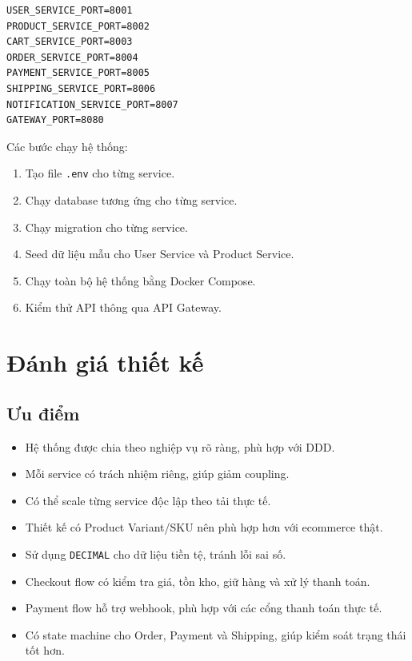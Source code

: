 \begin{lstlisting}[style=code]
USER_SERVICE_PORT=8001
PRODUCT_SERVICE_PORT=8002
CART_SERVICE_PORT=8003
ORDER_SERVICE_PORT=8004
PAYMENT_SERVICE_PORT=8005
SHIPPING_SERVICE_PORT=8006
NOTIFICATION_SERVICE_PORT=8007
GATEWAY_PORT=8080
\end{lstlisting}

Các bước chạy hệ thống:

\begin{enumerate}
  \item Tạo file \texttt{.env} cho từng service.
  \item Chạy database tương ứng cho từng service.
  \item Chạy migration cho từng service.
  \item Seed dữ liệu mẫu cho User Service và Product Service.
  \item Chạy toàn bộ hệ thống bằng Docker Compose.
  \item Kiểm thử API thông qua API Gateway.
\end{enumerate}

\section{Đánh giá thiết kế}

\subsection{Ưu điểm}

\begin{itemize}
  \item Hệ thống được chia theo nghiệp vụ rõ ràng, phù hợp với DDD.
  \item Mỗi service có trách nhiệm riêng, giúp giảm coupling.
  \item Có thể scale từng service độc lập theo tải thực tế.
  \item Thiết kế có Product Variant/SKU nên phù hợp hơn với ecommerce thật.
  \item Sử dụng \texttt{DECIMAL} cho dữ liệu tiền tệ, tránh lỗi sai số.
  \item Checkout flow có kiểm tra giá, tồn kho, giữ hàng và xử lý thanh toán.
  \item Payment flow hỗ trợ webhook, phù hợp với các cổng thanh toán thực tế.
  \item Có state machine cho Order, Payment và Shipping, giúp kiểm soát trạng thái tốt hơn.
\end{itemize}

